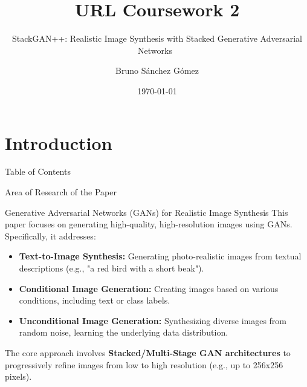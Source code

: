 \documentclass{beamer}
\title{URL Coursework 2}
\subtitle{StackGAN++: Realistic Image Synthesis with Stacked Generative Adversarial Networks~\cite{stackgan++}}
\author{Bruno Sánchez Gómez}
\date{\today}
\begin{document}
\begin{frame}
    \titlepage
\end{frame}

\section{Introduction}
\begin{frame}{Table of Contents}
    \tableofcontents[currentsection]
\end{frame}

\begin{frame}{Area of Research of the Paper}
    \begin{block}{Generative Adversarial Networks (GANs) for Realistic Image Synthesis}
        This paper focuses on generating high-quality, high-resolution images using GANs. Specifically, it addresses:
    \end{block}
    \begin{itemize}
        \item \textbf{Text-to-Image Synthesis:} Generating photo-realistic images from textual descriptions (e.g., "a red bird with a short beak").
        \item \textbf{Conditional Image Generation:} Creating images based on various conditions, including text or class labels.
        \item \textbf{Unconditional Image Generation:} Synthesizing diverse images from random noise, learning the underlying data distribution.
    \end{itemize}
    \vspace{0.5cm}
    The core approach involves \textbf{Stacked/Multi-Stage GAN architectures} to progressively refine images from low to high resolution (e.g., up to 256x256 pixels).
\end{frame}
\end{document}
